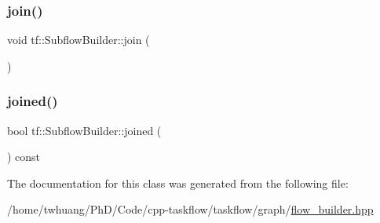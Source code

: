 \mbox{\label{classtf_1_1SubflowBuilder_a10cff676153ad0e83d15a33e8469f59e}} 
\subsubsection{\texorpdfstring{join()}{join()}}
{\footnotesize\ttfamily void tf\+::\+Subflow\+Builder\+::join (\begin{DoxyParamCaption}{ }\end{DoxyParamCaption})\hspace{0.3cm}{\ttfamily [inline]}}

\mbox{\label{classtf_1_1SubflowBuilder_a7e6d76a68180e51cb4108f58a14d5216}} 
\subsubsection{\texorpdfstring{joined()}{joined()}}
{\footnotesize\ttfamily bool tf\+::\+Subflow\+Builder\+::joined (\begin{DoxyParamCaption}{ }\end{DoxyParamCaption}) const\hspace{0.3cm}{\ttfamily [inline]}}



The documentation for this class was generated from the following file\+:\begin{DoxyCompactItemize}
\item 
/home/twhuang/\+Ph\+D/\+Code/cpp-\/taskflow/taskflow/graph/\hyperlink{flow__builder_8hpp}{flow\+\_\+builder.\+hpp}\end{DoxyCompactItemize}
